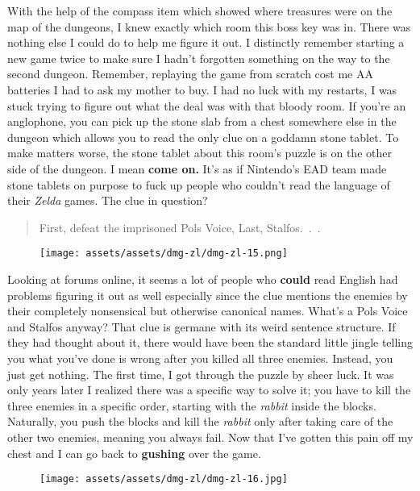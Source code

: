 \documentclass{book}
\begin{document}
With the help of the compass item which showed where treasures were on the map of the dungeons, I knew exactly which room this boss key was in. There was nothing else I could do to help me figure it out. I distinctly remember starting a new game twice to make sure I hadn’t forgotten something on the way to the second dungeon. Remember, replaying the game from scratch cost me AA batteries I had to ask my mother to buy. I had no luck with my restarts, I was stuck trying to figure out what the deal was with that bloody room. If you’re an anglophone, you can pick up the stone slab from a chest somewhere else in the dungeon which allows you to read the only clue on a goddamn stone tablet. To make matters worse, the stone tablet about this room’s puzzle is on the other side of the dungeon. I mean \textbf{come on.} It’s as if Nintendo’s EAD team made stone tablets on purpose to fuck up people who couldn’t read the language of their \emph{Zelda} games. The clue in question?

\begin{quote}
First, defeat the imprisoned Pols Voice, Last, Stalfos.~.~.
\end{quote} \par

\begin{figure}[hbt]
\vskip 10pt
\centering \texttt{[image: assets/assets/dmg-zl/dmg-zl-15.png]}
\vskip 6pt
\end{figure}

Looking at forums online, it seems a lot of people who \textbf{could} read English had problems figuring it out as well especially since the clue mentions the enemies by their completely nonsensical but otherwise canonical names. What’s a Pols Voice and Stalfos anyway? That clue is germane with its weird sentence structure. If they had thought about it, there would have been the standard little jingle telling you what you’ve done is wrong after you killed all three enemies. Instead, you just get nothing. The first time, I got through the puzzle by sheer luck. It was only years later I realized there was a specific way to solve it; you have to kill the three enemies in a specific order, starting with the \emph{rabbit} inside the blocks. Naturally, you push the blocks and kill the \emph{rabbit} only after taking care of the other two enemies, meaning you always fail. Now that I’ve gotten this pain off my chest and I can go back to \textbf{gushing} over the game.

\begin{figure}[hbt]
\vskip 10pt
\centering \texttt{[image: assets/assets/dmg-zl/dmg-zl-16.jpg]}
\vskip 6pt
\end{figure}
\end{document}
